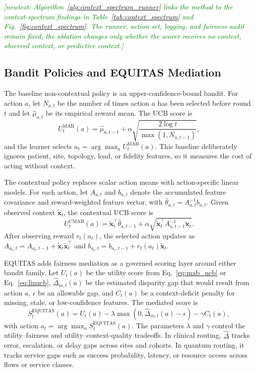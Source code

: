 \documentclass[conference]{IEEEtran}
\newcommand{\newtext}[1]{\textcolor{green}{{\it [newtext: #1]}}}
\begin{document}
\newtext{Algorithm~\ref{alg:context_spectrum_runner} links the method to the
context-spectrum findings in Table~\ref{tab:context_spectrum} and
Fig.~\ref{fig:context_spectrum}. The runner, action set, logging, and fairness
audit remain fixed; the ablation changes only whether the scorer receives no
context, observed context, or predictive context.}

\subsection{Bandit Policies and EQUITAS Mediation}
The baseline non-contextual policy is an upper-confidence-bound bandit. For
action $a$, let $N_{a,t}$ be the number of times action $a$ has been selected
before round $t$ and let $\hat{\mu}_{a,t}$ be its empirical reward mean. The
UCB score is
\begin{equation}
U^{\mathrm{MAB}}_{t}(a) =
\hat{\mu}_{a,t-1} +
\alpha \sqrt{\frac{2\log t}{\max(1,N_{a,t-1})}},
\label{eq:mab_ucb}
\end{equation}
and the learner selects $a_t=\arg\max_a U^{\mathrm{MAB}}_{t}(a)$. This
baseline deliberately ignores patient, site, topology, load, or fidelity
features, so it measures the cost of acting without context.

The contextual policy replaces scalar action means with action-specific linear
models. For each action, let $A_{a,t}$ and $b_{a,t}$ denote the accumulated
feature covariance and reward-weighted feature vector, with
$\hat{\theta}_{a,t}=A_{a,t}^{-1}b_{a,t}$. Given observed context
$\tilde{\mathbf{x}}_t$, the contextual UCB score is
\begin{equation}
U^{\mathrm{CMAB}}_{t}(a) =
\tilde{\mathbf{x}}_t^\top\hat{\theta}_{a,t-1} +
\alpha
\sqrt{\tilde{\mathbf{x}}_t^\top A_{a,t-1}^{-1}\tilde{\mathbf{x}}_t}.
\label{eq:linucb}
\end{equation}
After observing reward $r_t(a_t)$, the selected action updates as
$A_{a_t,t}=A_{a_t,t-1}+\tilde{\mathbf{x}}_t\tilde{\mathbf{x}}_t^\top$ and
$b_{a_t,t}=b_{a_t,t-1}+r_t(a_t)\tilde{\mathbf{x}}_t$.

EQUITAS adds fairness mediation as a governed scoring layer around either
bandit family. Let $U_t(a)$ be the utility score from
Eq.~\ref{eq:mab_ucb} or Eq.~\ref{eq:linucb}, $\widehat{\Delta}_{m,t}(a)$ be
the estimated disparity gap that would result from action $a$, $\epsilon$ be
an allowable gap, and $C_t(a)$ be a context-deficit penalty for missing,
stale, or low-confidence features. The mediated score is
\begin{equation}
S^{\mathrm{EQUITAS}}_t(a) =
U_t(a) -
\lambda \max \left(0,\widehat{\Delta}_{m,t}(a)-\epsilon\right) -
\gamma C_t(a),
\label{eq:equitas_score}
\end{equation}
with action $a_t=\arg\max_a S^{\mathrm{EQUITAS}}_t(a)$. The parameters
$\lambda$ and $\gamma$ control the utility--fairness and
utility--context-quality tradeoffs. In clinical routing, $\widehat{\Delta}$
tracks error, escalation, or delay gaps across sites and cohorts. In quantum
routing, it tracks service gaps such as success probability, latency, or
resource access across flows or service classes.
\end{document}
